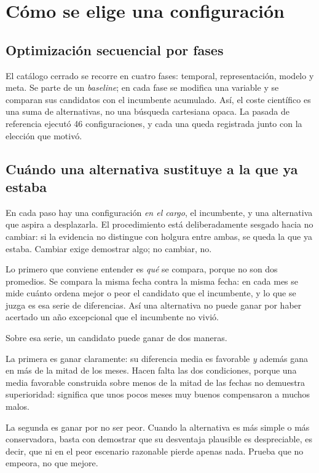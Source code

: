 \section{Cómo se elige una configuración}

\subsection{Optimización secuencial por fases}

El catálogo cerrado se recorre en cuatro fases: temporal, representación, modelo y meta. Se parte
de un \textit{baseline}; en cada fase se modifica una variable y se comparan sus candidatos con el
incumbente acumulado. Así, el coste científico es una suma de alternativas, no una búsqueda
cartesiana opaca. La pasada de referencia ejecutó 46 configuraciones, y cada una queda registrada
junto con la elección que motivó.

\subsection{Cuándo una alternativa sustituye a la que ya estaba}
\label{sec:regla-decision}

En cada paso hay una configuración \emph{en el cargo}, el incumbente, y una alternativa que aspira a
desplazarla. El procedimiento está deliberadamente sesgado hacia no cambiar: si la evidencia no
distingue con holgura entre ambas, se queda la que ya estaba. Cambiar exige demostrar algo; no
cambiar, no.

Lo primero que conviene entender es \emph{qué} se compara, porque no son dos promedios. Se compara
la misma fecha contra la misma fecha: en cada mes se mide cuánto ordena mejor o peor el candidato
que el incumbente, y lo que se juzga es esa serie de diferencias. Así una alternativa no puede ganar
por haber acertado un año excepcional que el incumbente no vivió.

Sobre esa serie, un candidato puede ganar de dos maneras.

La primera es ganar claramente: su diferencia media es favorable \emph{y} además gana en
más de la mitad de los meses. Hacen falta las dos condiciones, porque una media favorable construida
sobre menos de la mitad de las fechas no demuestra superioridad: significa que unos pocos meses muy
buenos compensaron a muchos malos.

La segunda es ganar por no ser peor. Cuando la alternativa es más simple o más
conservadora, basta con demostrar que su desventaja plausible es despreciable, es decir, que ni en
el peor escenario razonable pierde apenas nada. Prueba que no empeora, no que mejore.

